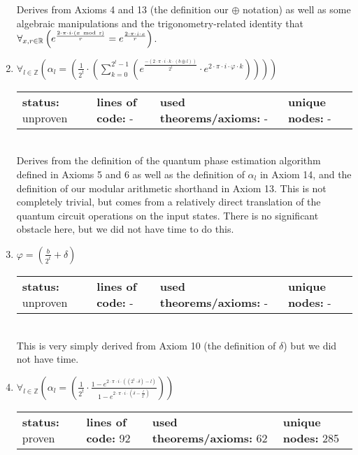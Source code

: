 \documentclass{article}[12pt]
\begin{document}
\begin{enumerate}
  Derives from Axioms 4 and 13 (the definition our $\oplus$ notation) as well as some algebraic manipulations and the trigonometry-related identity that
  $\forall_{x, r \in \mathbb{R}} \left(e^{\frac{2 \cdot \pi \cdot i \cdot \left(x ~\rm{mod}~ r\right)}{r}} = e^{\frac{2 \cdot \pi \cdot i \cdot x}{r}}\right)$.
\item $\forall_{l \in \mathbb{Z}} \left(\alpha_{l} = \left(\frac{1}{2^{t}} \cdot \left(\sum_{k=0}^{2^{t} - 1} \left(e^{\frac{-\left(2 \cdot \pi \cdot i \cdot k \cdot \left(b \oplus l\right)\right)}{2^{t}}} \cdot e^{2 \cdot \pi \cdot i \cdot \varphi \cdot k}\right)\right)\right)\right)$ \hfill \\
  \begin{tabular}{l | l | l | l}
    \textbf{status:} unproven & \textbf{lines of code:} - & \textbf{used theorems/axioms:} - & \textbf{unique nodes:} -    
  \end{tabular} \hfill \\
Derives from the definition of the quantum phase estimation algorithm defined in Axioms 5 and 6 as well as the definition of $\alpha_l$ in Axiom 14, and the definition of our modular arithmetic shorthand in Axiom 13.  This is not completely trivial, but comes from a relatively direct translation of the quantum circuit operations on the input states.  There is no significant obstacle here, but we did not have time to do this.
\item $\varphi = \left(\frac{b}{2^{t}} + \delta\right)$ \hfill \\
  \begin{tabular}{l | l | l | l}
    \textbf{status:} unproven & \textbf{lines of code:} - & \textbf{used theorems/axioms:} - & \textbf{unique nodes:} -        
  \end{tabular} \hfill \\
This is very simply derived from Axiom 10 (the definition of $\delta$) but we did not have time.
\item $\forall_{l \in \mathbb{Z}} \left(\alpha_{l} = \left(\frac{1}{2^{t}} \cdot \frac{1 - e^{2 \cdot \pi \cdot i \cdot \left(\left(2^{t} \cdot \delta\right) - l\right)}}{1 - e^{2 \cdot \pi \cdot i \cdot \left(\delta - \frac{l}{2^{t}}\right)}}\right)\right)$ \hfill \\
  \begin{tabular}{l | l | l | l}
    \textbf{status:} proven & \textbf{lines of code:} 92 & \textbf{used theorems/axioms:} 62 & \textbf{unique nodes:} 285
  \end{tabular} \hfill \\

\end{enumerate}
\end{document}
